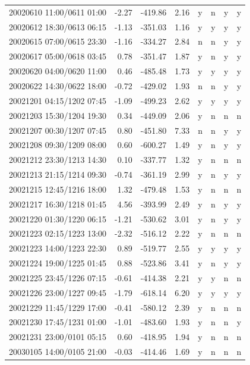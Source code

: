 \documentclass[draft]{agujournal2019}
\begin{document}
\begin{center}
\begin{longtable}{l|rcc|cccc}
20020610 11:00/0611 01:00 & -2.27 & -419.86 & 2.16 & y & n & y & y \\
20020612 18:30/0613 06:15 & -1.13 & -351.03 & 1.16 & y & y & y & y \\
20020615 07:00/0615 23:30 & -1.16 & -334.27 & 2.84 & n & n & y & y \\
20020617 05:00/0618 03:45 & 0.78 & -351.47 & 1.87 & y & n & y & y \\
20020620 04:00/0620 11:00 & 0.46 & -485.48 & 1.73 & y & y & y & y \\
20020622 14:30/0622 18:00 & -0.72 & -429.02 & 1.93 & n & n & y & y \\
20021201 04:15/1202 07:45 & -1.09 & -499.23 & 2.62 & y & y & y & y \\
20021203 15:30/1204 19:30 & 0.34 & -449.09 & 2.06 & y & n & n & n \\
20021207 00:30/1207 07:45 & 0.80 & -451.80 & 7.33 & n & n & y & y \\
20021208 09:30/1209 08:00 & 0.60 & -600.27 & 1.49 & y & n & y & y \\
20021212 23:30/1213 14:30 & 0.10 & -337.77 & 1.32 & y & n & n & n \\
20021213 21:15/1214 09:30 & -0.74 & -361.19 & 2.99 & y & n & y & y \\
20021215 12:45/1216 18:00 & 1.32 & -479.48 & 1.53 & y & n & n & n \\
20021217 16:30/1218 01:45 & 4.56 & -393.99 & 2.49 & y & n & y & y \\
20021220 01:30/1220 06:15 & -1.21 & -530.62 & 3.01 & y & n & y & y \\
20021223 02:15/1223 13:00 & -2.32 & -516.12 & 2.22 & y & n & n & n \\
20021223 14:00/1223 22:30 & 0.89 & -519.77 & 2.55 & y & y & y & y \\
20021224 19:00/1225 01:45 & 0.88 & -523.86 & 3.41 & y & n & y & y \\
20021225 23:45/1226 07:15 & -0.61 & -414.38 & 2.21 & y & y & n & n \\
20021226 23:00/1227 09:45 & -1.79 & -618.14 & 6.20 & y & y & y & y \\
20021229 11:45/1229 17:00 & -0.41 & -580.12 & 2.39 & y & n & n & n \\
20021230 17:45/1231 01:00 & -1.01 & -483.60 & 1.93 & y & n & n & y \\
20021231 23:00/0101 05:15 & 0.60 & -418.95 & 1.94 & y & n & n & n \\
20030105 14:00/0105 21:00 & -0.03 & -414.46 & 1.69 & y & n & n & n \\

\end{longtable}
\end{center}
\end{document}
